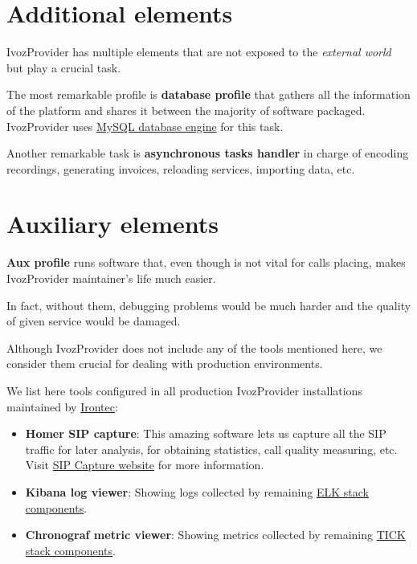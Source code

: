 \documentclass[letterpaper,10pt,spanish]{sphinxmanual}
\begin{document}
\section{Additional elements}
\label{basic_concepts/architecture/index:additional-elements}
IvozProvider has multiple elements that are not exposed to the \emph{external world}
but play a crucial task.

The most remarkable profile is \textbf{database profile} that gathers all the
information of the platform and shares it between the majority of software packaged.
IvozProvider uses \href{https://www.mysql.com/}{MySQL database engine} for this task.

Another remarkable task is \textbf{asynchronous tasks handler} in charge of encoding recordings,
generating invoices, reloading services, importing data, etc.


\section{Auxiliary elements}
\label{basic_concepts/architecture/index:auxiliary-elements}
\textbf{Aux profile} runs software that, even though is not vital for calls placing,
makes IvozProvider maintainer's life much easier.

In fact, without them, debugging problems would be much harder and the quality
of given service would be damaged.

Although IvozProvider does not include any of the tools mentioned here, we consider them crucial for dealing with
production environments.

We list here tools configured in all production IvozProvider installations maintained by
\href{https://www.irontec.com}{Irontec}:
\begin{itemize}
\item {} 
\textbf{Homer SIP capture}: This amazing software lets us capture all the SIP traffic
for later analysis, for obtaining statistics, call quality measuring, etc.
Visit \href{http://sipcapture.org/}{SIP Capture website} for more information.

\item {} 
\textbf{Kibana log viewer}: Showing logs collected by remaining \href{https://www.elastic.co/elk-stack}{ELK stack components}.

\item {} 
\textbf{Chronograf metric viewer}: Showing metrics collected by remaining \href{https://www.influxdata.com/time-series-platform/}{TICK stack components}.

\end{itemize}
\end{document}
